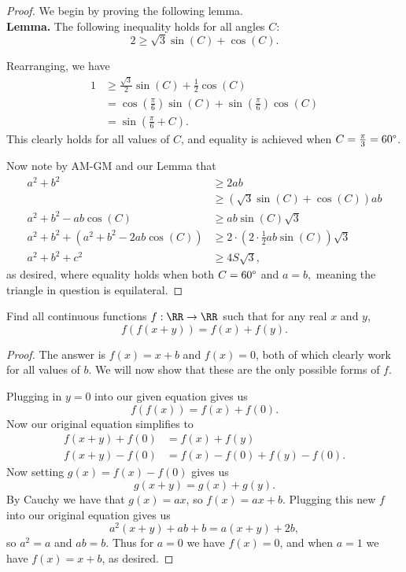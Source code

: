 \documentclass[letterpaper,oneside]{scrartcl}
\begin{document}
\begin{proof}
  We begin by proving the following lemma.\\
  \textbf{Lemma.} The following inequality holds for all angles \(C\):
  \[2 \geq \sqrt3\sin(C)+\cos(C).\]
  \begin{subproof}
    Rearranging, we have
    \begin{align*}
      1 & \geq \frac{\sqrt3}{2}\sin(C) + \frac12\cos(C)                                 \\
        & = \cos\left(\frac{\pi}{6}\right)\sin(C)+\sin\left(\frac{\pi}{6}\right)\cos(C) \\
        & = \sin\left(\frac{\pi}{6}+C\right).
    \end{align*}
    This clearly holds for all values of \(C\), and equality is achieved when \(C = \tfrac{\pi}{3} = 60\degree\).
  \end{subproof}

  Now note by AM-GM and our Lemma that
  \begin{align*}
    a^2 + b^2                     & \geq 2ab                                              \\
                                  & \geq \left(\sqrt3\sin(C)+\cos(C)\right)ab             \\
    a^2+b^2-ab\cos(C)             & \geq ab\sin(C)\sqrt3                                  \\
    a^2+b^2 +(a^2+b^2-2ab\cos(C)) & \geq 2\cdot\left(2\cdot\tfrac12ab\sin(C)\right)\sqrt3 \\
    a^2+b^2 +c^2                  & \geq 4S\sqrt3,
  \end{align*}
  as desired, where equality holds when both \(C = 60\degree\) and \(a=b,\) meaning the triangle in question is equilateral.
\end{proof}
\newpage
\begin{problem*}
  Find all continuous functions \(f : \RR \rightarrow \RR\) such that for any real \(x\) and \(y\),
  \[f(f(x+y)) = f(x)+f(y).\]
\end{problem*}
\begin{proof}
  The answer is \(f(x) = x + b\) and \(f(x)=0\), both of which clearly work for all values of \(b\). We will now show that these are the only possible forms of \(f\).

  Plugging in \(y=0\) into our given equation gives us
  \[f(f(x)) = f(x) + f(0).\]
  Now our original equation simplifies to
  \begin{align*}
    f(x+y)+f(0) & = f(x) + f(y)                \\
    f(x+y)-f(0) & = f(x) - f(0) + f(y) - f(0).
  \end{align*}
  Now setting \(g(x) = f(x)-f(0)\) gives us
  \[g(x+y) = g(x) + g(y).\]
  By Cauchy we have that \(g(x) = ax\), so \(f(x) = ax+b.\) Plugging this new \(f\) into our original equation gives us
  \[a^2(x+y) + ab + b = a(x+y)+2b,\]
  so \(a^2=a\) and \(ab=b\). Thus for \(a=0\) we have \(f(x)=0\), and when \(a=1\) we have \(f(x) = x+b\), as desired.
\end{proof}
\end{document}
